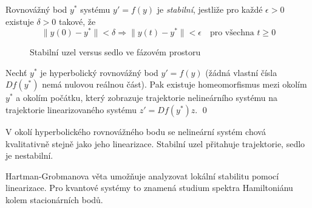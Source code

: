\begin{definition}
Rovnovážný bod $y^*$ systému $y' = f(y)$ je \emph{stabilní}, jestliže pro každé $\epsilon > 0$ existuje $\delta > 0$ takové, že
\[
\|y(0) - y^*\| < \delta \Rightarrow \|y(t) - y^*\| < \epsilon \quad \text{pro všechna } t \geq 0
\]
\end{definition}

\begin{figure}[h]
\centering
{}
\caption{Stabilní uzel versus sedlo ve fázovém prostoru}
\label{fig:stability-types}
\end{figure}

\begin{theorem}
Nechť $y^*$ je hyperbolický rovnovážný bod $y' = f(y)$ (žádná vlastní čísla $Df(y^*)$ nemá nulovou reálnou část). Pak existuje homeomorfismus mezi okolím $y^*$ a okolím počátku, který zobrazuje trajektorie nelineárního systému na trajektorie linearizovaného systému $z' = Df(y^*)z$.
\qed
\end{theorem}

\begin{intuition}
V okolí hyperbolického rovnovážného bodu se nelineární systém chová kvalitativně stejně jako jeho linearizace. Stabilní uzel přitahuje trajektorie, sedlo je nestabilní.
\end{intuition}

\begin{keyinsight}
Hartman-Grobmanova věta umožňuje analyzovat lokální stabilitu pomocí linearizace. Pro kvantové systémy to znamená studium spektra Hamiltoniánu kolem stacionárních bodů.
\end{keyinsight}

